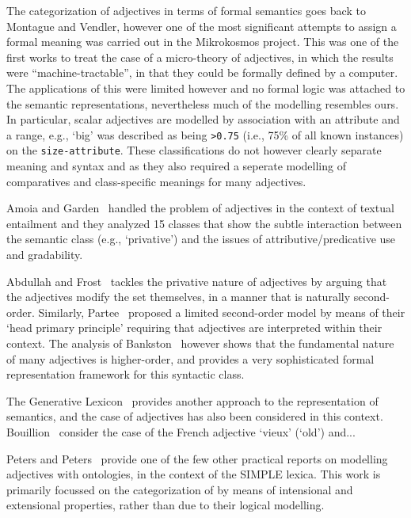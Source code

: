 \documentclass[11pt]{article}
\begin{document}
The categorization of adjectives in terms of formal semantics goes back to Montague and Vendler, however one of the most significant attempts to assign a formal meaning was carried out in the Mikrokosmos project\cite{raskin1995lexical}. This was one of the first works to treat the case of a micro-theory of adjectives, in which the results were ``machine-tractable'', in that they could be formally defined by a computer. The applications of this were limited however and no formal logic was attached to the semantic representations, nevertheless much of the modelling resembles ours. In particular, scalar adjectives are modelled by association with an attribute and a range, e.g., `big' was described as being {\tt >0.75} (i.e., 75\% of all known instances) on the {\tt size-attribute}. These classifications do not however clearly separate meaning and syntax and as they also required a seperate modelling of comparatives and class-specific meanings for many adjectives.

Amoia and Garden~ handled the problem of adjectives in the context of textual entailment and they analyzed 15 classes that show the subtle interaction between the semantic class (e.g., `privative') and the issues of attributive/predicative use and gradability. 

Abdullah and Frost~ tackles the privative nature of adjectives by arguing that the adjectives modify the set themselves, in a manner that is naturally second-order. Similarly, Partee~ proposed a limited second-order model by means of their `head primary principle' requiring that adjectives are interpreted within their context. The analysis of Bankston~ however shows that the fundamental nature of many adjectives is higher-order, and provides a very sophisticated formal representation framework for this syntactic class.

The Generative Lexicon~\cite{pustejovsky1991generative} provides another approach to the representation of semantics, and the case of adjectives has also been considered in this context. Bouillion~ consider the case of the French adjective `vieux' (`old') and...

Peters and Peters~ provide one of the few other practical reports on modelling adjectives with ontologies, in the context of the SIMPLE lexica. This work is primarily focussed on the categorization of by means of intensional and extensional properties, rather than due to their logical modelling. 
\end{document}

